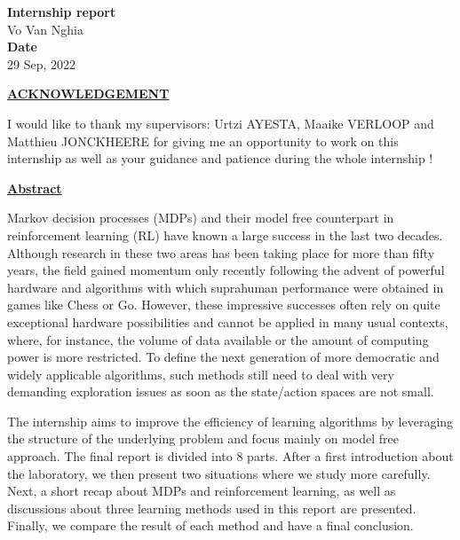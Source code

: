 \documentclass[
  a4paper, xcolor = usenames,dvipsnames]{article}
\author{}
\date{\vspace{-2.5em}}
\theoremstyle{definition}
\theoremstyle{definition}
\theoremstyle{definition}
\theoremstyle{definition}
\theoremstyle{remark}
\begin{document}
\onehalfspacing


\vspace*{\fill}
\begin{center}
  \Large{\textbf{Internship report}}\\
  \vspace*{1\baselineskip}
  Vo Van Nghia\\
  \vfill
  \vspace*{\fill}
  \Large{\textbf{Date}}\\
  29 Sep, 2022
\end{center}

\newpage

\newpage
{}
\renewcommand{\contentsname}{Table of contents}
\tableofcontents

\newpage

\begin{center}
  \underline{\textbf{ACKNOWLEDGEMENT}}
\end{center}
I would like to thank my supervisors: Urtzi AYESTA, Maaike VERLOOP and Matthieu JONCKHEERE for giving me an opportunity to work on this internship as well as your guidance and patience during the whole internship !

\newpage

\begin{center}
  \underline{\textbf{Abstract}}
\end{center}
Markov decision processes (MDPs) and their model free counterpart in reinforcement learning (RL) have known a large success in the last two decades. Although research in these two areas has been taking place for more than fifty years, the field gained momentum only recently following the advent of powerful hardware and algorithms with which suprahuman performance were obtained in games like Chess or Go. However, these impressive successes often rely on quite exceptional hardware possibilities and cannot be applied in many usual contexts, where, for instance, the volume of data available or the amount of computing power is more restricted. To define the next generation of more democratic and widely applicable algorithms, such methods still need to deal with very demanding exploration issues as soon as the state/action spaces are not small.

The internship aims to improve the efficiency of learning algorithms by leveraging the structure of the underlying problem and focus mainly on model free approach. The final report is divided into 8 parts. After a first introduction about the laboratory, we then present two situations where we study more carefully. Next, a short recap about MDPs and reinforcement learning, as well as discussions about three learning methods used in this report are presented. Finally, we compare the result of each method and have a final conclusion.
\end{document}
